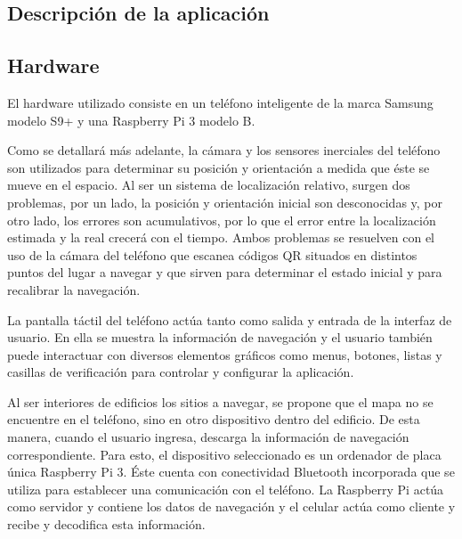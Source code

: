 \documentclass{article}
\newenvironment{standalone}{\begin{preview}}{\end{preview}}
\begin{document}
\begin{standalone}

  \section{Descripción de la aplicación}

  \subsection{Hardware}

  El hardware utilizado consiste en un teléfono inteligente de la marca Samsung modelo S9+ y una Raspberry Pi 3 modelo B.

  Como se detallará más adelante, la cámara y los sensores inerciales del teléfono son utilizados para determinar su posición y orientación a medida que éste se mueve en el espacio.
  Al ser un sistema de localización relativo, surgen dos problemas, por un lado, la posición y orientación inicial son desconocidas y, por otro lado, los errores son acumulativos, por lo que el error entre la localización estimada y la real crecerá con el tiempo.
  Ambos problemas se resuelven con el uso de la cámara del teléfono que escanea códigos QR situados en distintos puntos del lugar a navegar y que sirven para determinar el estado inicial y para recalibrar la navegación.

  La pantalla táctil del teléfono actúa tanto como salida y entrada de la interfaz de usuario.
  En ella se muestra la información de navegación y el usuario también puede interactuar con diversos elementos gráficos como menus, botones, listas y casillas de verificación para controlar y configurar la aplicación.

  Al ser interiores de edificios los sitios a navegar, se propone que el mapa no se encuentre en el teléfono, sino en otro dispositivo dentro del edificio.
  De esta manera, cuando el usuario ingresa, descarga la información de navegación correspondiente.
  Para esto, el dispositivo seleccionado es un ordenador de placa única Raspberry Pi 3.
  Éste cuenta con conectividad Bluetooth incorporada que se utiliza para establecer una comunicación con el teléfono.
  La Raspberry Pi actúa como servidor y contiene los datos de navegación y el celular actúa como cliente y recibe y decodifica esta información.


\end{standalone}
\end{document}

